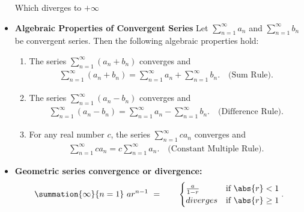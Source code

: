 \documentclass{report}
\begin{document}
\begin{itemize}
        Which diverges to $+\infty$
    \item \textbf{Algebraic Properties of Convergent Series}
        Let $ \sum_{n=1}^{\infty} a_n$ and $\sum_{n=1}^{\infty} b_n$ be convergent series. Then the following algebraic properties hold:
        \begin{enumerate}
            \item The series 
            $\sum_{n=1}^{\infty} (a_n + b_n)$ converges and 
            \begin{align*}
                \sum_{n=1}^{\infty} (a_n + b_n) = \sum_{n=1}^{\infty} a_n + \sum_{n=1}^{\infty} b_n. \quad \text{(Sum Rule)}
            .\end{align*}
            \item The series $\sum_{n=1}^{\infty} (a_n - b_n)$ converges and 
                \begin{align*}
                    \sum_{n=1}^{\infty} (a_n - b_n) = \sum_{n=1}^{\infty} a_n - \sum_{n=1}^{\infty} b_n. \quad \text{(Difference Rule)}
                .\end{align*}
            \item For any real number \( c \), the series $\sum_{n=1}^{\infty} c a_n$ converges and 
                \begin{align*}
                    \sum_{n=1}^{\infty} c a_n = c \sum_{n=1}^{\infty} a_n. \quad \text{(Constant Multiple Rule)}
                .\end{align*}
        \end{enumerate}

    \item \textbf{Geometric series convergence or divergence: }
    \begin{align*}
       \summation{\infty}{n=1}\ ar^{n-1} \  = \quad \quad 
        \begin{cases}
             \frac{a}{1-r} & \text{if }  \abs{r} < 1\\
             diverges & \text{if }  \abs{r} \geq 1
        \end{cases}
    .\end{align*}


\end{itemize}
\end{document}
